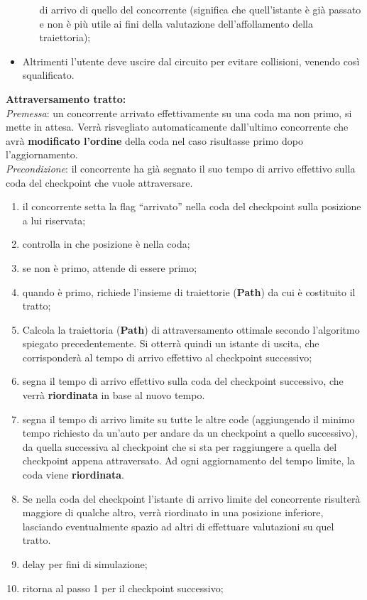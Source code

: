 \begin{description}
\begin{itemize}
\begin{itemize}
di arrivo di quello del concorrente (significa che quell'istante è già passato e non è più utile ai fini della valutazione dell'affollamento
della traiettoria);
\end{itemize}
\item Altrimenti l'utente deve uscire dal circuito per evitare collisioni, venendo così squalificato.
\end{itemize}
\item{\textbf{Attraversamento tratto:}}\\
\emph{Premessa}: un concorrente arrivato effettivamente su una coda ma non primo, si mette in attesa. 
Verrà risvegliato automaticamente dall'ultimo concorrente che avrà \textbf{modificato l'ordine} della coda nel
caso risultasse primo dopo l'aggiornamento.\\
\emph{Precondizione}: il concorrente ha gi\`{a} segnato il suo tempo di arrivo
effettivo sulla coda del checkpoint che vuole attraversare.
\begin{enumerate}
\item il concorrente setta la flag ``arrivato'' nella coda del checkpoint sulla
posizione a lui riservata;
\item controlla in che posizione \`{e} nella coda;
\item se non \`{e} primo, attende di essere primo;
\item quando \`{e} primo, richiede l'insieme di traiettorie (\textbf{Path}) da
cui \`{e} costituito il tratto;
\item Calcola la traiettoria (\textbf{Path}) di attraversamento ottimale secondo l'algoritmo spiegato precedentemente.
Si otterrà quindi un istante di uscita, che corrisponderà al tempo di arrivo effettivo al checkpoint successivo;
\item segna il tempo di arrivo effettivo sulla coda del checkpoint successivo, che verr\`{a}
\textbf{riordinata} in base al nuovo tempo.
\item segna il tempo di arrivo limite su tutte le altre code (aggiungendo il minimo tempo richiesto da un'auto
per andare da un checkpoint a quello successivo), da quella
successiva al checkpoint che si sta per raggiungere a quella del checkpoint
appena attraversato. Ad ogni aggiornamento del tempo limite, la coda viene
\textbf{riordinata}.
\item Se nella coda del checkpoint l'istante di arrivo limite del concorrente risulterà maggiore di qualche altro, 
verrà riordinato in una posizione inferiore, lasciando eventualmente spazio
ad altri di effettuare valutazioni su quel tratto.
\item delay per fini di simulazione;
\item ritorna al passo 1 per il checkpoint successivo;
\end{enumerate}
\end{description}
